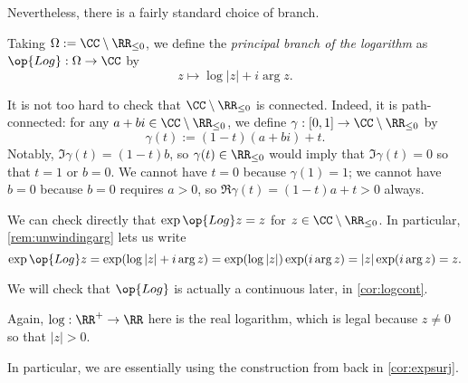 Nevertheless, there is a fairly standard choice of branch.
\begin{definition}
	Taking $\Omega:=\CC\setminus\RR_{\le0}$, we define the \textit{principal branch of the logarithm} as $\op{Log}:\Omega\to\CC$ by
	\[z\mapsto\log|z|+i\arg z.\]
\end{definition}
\begin{remark} \label{rem:checkconnected}
	It is not too hard to check that $\CC\setminus\RR_{\le0}$ is connected. Indeed, it is path-connected: for any $a+bi\in\CC\setminus\RR_{\le0}$, we define $\gamma:[0,1]\to\CC\setminus\RR_{\le0}$ by
	\[\gamma(t):=(1-t)(a+bi)+t.\]
	Notably, $\Im\gamma(t)=(1-t)b$, so $\gamma(t)\in\RR_{\le0}$ would imply that $\Im\gamma(t)=0$ so that $t=1$ or $b=0$. We cannot have $t=0$ because $\gamma(1)=1$; we cannot have $b=0$ because $b=0$ requires $a>0$, so $\Re\gamma(t)=(1-t)a+t>0$ always.
\end{remark}
\begin{remark} \label{rem:checklogisinverse}
	We can check directly that $\exp\op{Log}z=z$ for $z\in\CC\setminus\RR_{\le0}$. In particular, \autoref{rem:unwindingarg} lets us write
	\[\exp\op{Log}z=\exp(\log|z|+i\arg z)=\exp(\log|z|)\exp(i\arg z)=|z|\exp(i\arg z)=z.\]
\end{remark}
We will check that $\op{Log}$ is actually a continuous later, in \autoref{cor:logcont}.
\begin{remark}
	Again, $\log:\RR^+\to\RR$ here is the real logarithm, which is legal because $z\ne0$ so that $|z|>0$.
\end{remark}
In particular, we are essentially using the construction from back in \autoref{cor:expsurj}.

